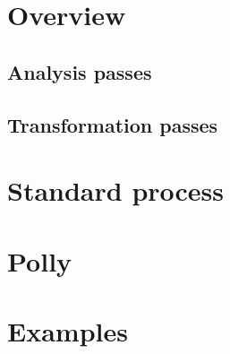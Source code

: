\section{Overview}
\subsection{Analysis passes}
\subsection{Transformation passes}
\section{Standard process}
\section{Polly}
\section{Examples}